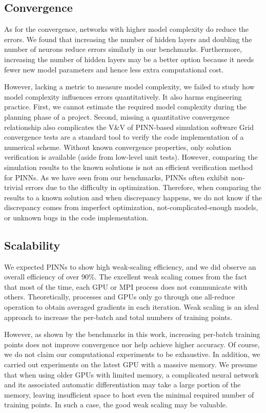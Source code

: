 \subsection*{Convergence}

As for the convergence, networks with higher model complexity do reduce the errors.
We found that increasing the number of hidden layers and doubling the number of neurons reduce errors similarly in our benchmarks.
Furthermore, increasing the number of hidden layers may be a better option because it needs fewer new model parameters and hence less extra computational cost.

However, lacking a metric to measure model complexity, we failed to study how model complexity influences errors quantitatively.
It also harms engineering practice. 
First, we cannot estimate the required model complexity during the planning phase of a project.
Second, missing a quantitative convergence relationship also complicates the V\&V of PINN-based simulation software
Grid convergence tests are a standard tool to verify the code implementation of a numerical scheme.
Without known convergence properties, only solution verification is available (aside from low-level unit tests).
However, comparing the simulation results to the known solutions is not an efficient verification method for PINNs.
As we have seen from our benchmarks, PINNs often exhibit non-trivial errors due to the difficulty in optimization.
Therefore, when comparing the results to a known solution and when discrepancy happens, we do not know if the discrepancy comes from imperfect optimization, not-complicated-enough models, or unknown bugs in the code implementation.

\subsection*{Scalability}

We expected PINNs to show high weak-scaling efficiency, and we did observe an overall efficiency of over 90\%.
The excellent weak scaling comes from the fact that most of the time, each GPU or MPI process does not communicate with others.
Theoretically, processes and GPUs only go through one all-reduce operation to obtain averaged gradients in each iteration.
Weak scaling is an ideal approach to increase the per-batch and total numbers of training points.

However, as shown by the benchmarks in this work, increasing per-batch training points does not improve convergence nor help achieve higher accuracy.
Of course, we do not claim our computational experiments to be exhaustive.
In addition, we carried out experiments on the latest GPU with a massive memory.
We presume that when using older GPUs with limited memory, a complicated neural network and its associated automatic differentiation may take a large portion of the memory, leaving insufficient space to host even the minimal required number of training points.
In such a case, the good weak scaling may be valuable.

